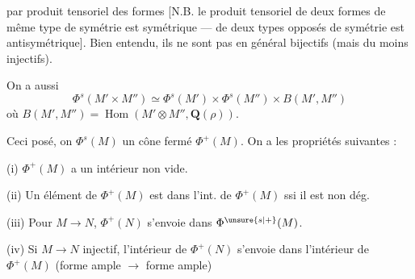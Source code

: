 par produit tensoriel des formes
[N.B. le produit tensoriel de deux formes
 de même type de symétrie
est symétrique --- de deux types opposés
de symétrie est antisymétrique]. Bien
entendu, ils ne sont pas en général
bijectifs (mais du moins injectifs).

On a aussi
\[
\Phi^s(M'\times M'')\simeq\Phi^s(M')\times\Phi^s(M'')\times B(M',M'')
\]
où $B(M',M'')=\operatorname{Hom}(M'\otimes M'',\mathbf Q(\rho))$.

Ceci posé, on 
$\Phi^s(M)$ un cône  fermé $\Phi^+(M)$.
On a les propriétés suivantes :

(i) $\Phi^+(M)$ a un intérieur non vide.

(ii) Un élément de $\Phi^+(M)$ est dans l'int. de $\Phi^+(M)$ ssi il est non dég.


(iii) Pour $M\longrightarrow N$, $\Phi^+(N)$ s'envoie dans $\Phi^{\unsure{s|+}}(M)$.

(iv)  Si $M\longrightarrow N$ injectif,
 l'intérieur
de $\Phi^+(N)$ s'envoie dans l'intérieur
de $\Phi^+(M)$ (forme ample $\longrightarrow$ forme ample)

